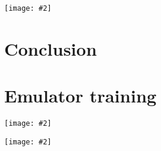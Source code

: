 \documentclass[aps, prc, reprint, amsmath]{revtex4-1}
\newcommand{\widefig}[3][t]{
  \begin{figure*}[#1]
    \texttt{[image: \#2]}
    \caption{\label{fig:#2}#3}
  \end{figure*}
}
\begin{document}
\widefig{posterior_draws_kln}{
  Same as FIG.~\ref{fig:posterior_draws_glb} for the KLN model.
}



\section{Conclusion}



\appendix


\section{Emulator training}

\widefig{training_posterior_glb}{
  Posterior marginal and joint distributions of the Gaussian process hyperparameters for the first Glauber principal component.
  The notation $\ell\;x$ means the squared-exponential correlation length for parameter $x$. \textbf{IMPROVE THIS}
  On the diagonal are histograms of MCMC samples for the respective hyperparameters,
  on the lower triangle are two-dimensional histograms of MCMC samples showing the correlation between pairs of hyperparameters.
  The upper triangle is blank for now. \textbf{FIXME}
}

\widefig{training_posterior_kln}{
  Same as FIG.~\ref{fig:training_posterior_glb} for the KLN model.
}




\end{document}
